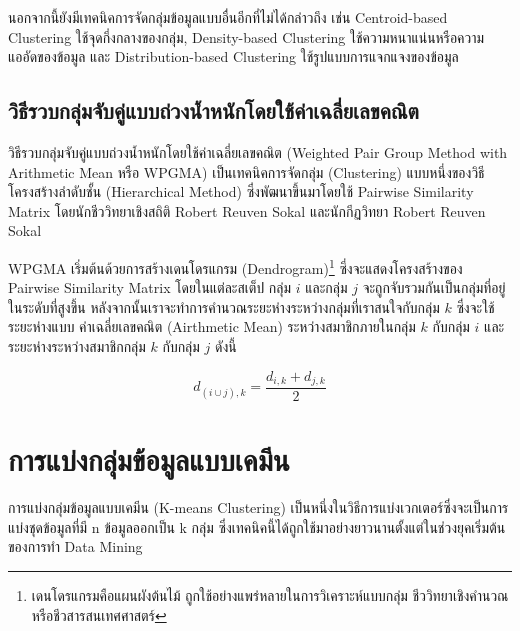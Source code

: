นอกจากนี้ยังมีเทคนิคการจัดกลุ่มข้อมูลแบบอื่นอีกที่ไม่ได้กล่าวถึง เช่น Centroid-based Clustering ใช้จุดกึ่งกลางของกลุ่ม, Density-based 
Clustering ใช้ความหนาแน่นหรือความแออัดของข้อมูล และ Distribution-based Clustering ใช้รูปแบบการแจกแจงของข้อมูล

\subsection{วิธีรวบกลุ่มจับคู่แบบถ่วงน้ำหนักโดยใช้ค่าเฉลี่ยเลขคณิต}
\label{ssec:wpgma}

วิธีรวบกลุ่มจับคู่แบบถ่วงน้ำหนักโดยใช้ค่าเฉลี่ยเลขคณิต (Weighted Pair Group Method with Arithmetic Mean หรือ WPGMA) 
เป็นเทคนิคการจัดกลุ่ม (Clustering) แบบหนึ่งของวิธีโครงสร้างลำดับชั้น (Hierarchical Method) ซึ่งพัฒนาขึ้นมาโดยใช้ Pairwise 
Similarity Matrix\autocite{sokal1958} โดยนักชีววิทยาเชิงสถิติ Robert Reuven Sokal และนักกีฏวิทยา Robert Reuven Sokal

WPGMA เริ่มต้นด้วยการสร้างเดนโดรแกรม (Dendrogram)\footnote{เดนโดรแกรมคือแผนผังต้นไม้ ถูกใช้อย่างแพร่หลายในการวิเคราะห์แบบกลุ่ม
ชีววิทยาเชิงคำนวณหรือชีวสารสนเทศศาสตร์} ซึ่งจะแสดงโครงสร้างของ Pairwise Similarity Matrix โดยในแต่ละสเต็ป กลุ่ม $i$ และกลุ่ม 
$j$ จะถูกจับรวมกันเป็นกลุ่มที่อยู่ในระดับที่สูงขึ้น หลังจากนั้นเราจะทำการคำนวณระยะห่างระหว่างกลุ่มที่เราสนใจกับกลุ่ม $k$ ซึ่งจะใช้ระยะห่างแบบ%
ค่าเฉลี่ยเลขคณิต (Airthmetic Mean) ระหว่างสมาชิกภายในกลุ่ม $k$ กับกลุ่ม $i$ และระยะห่างระหว่างสมาชิกกลุ่ม $k$ กับกลุ่ม $j$ ดังนี้

\begin{equation}\label{eq:wpgma}
    d_{(i \cup j),k} = \frac{d_{i,k} + d_{j,k}}{2} 
\end{equation}

\section{การแบ่งกลุ่มข้อมูลแบบเคมีน}
\label{sec:k_means}

การแบ่งกลุ่มข้อมูลแบบเคมีน (K-means Clustering) เป็นหนึ่งในวิธีการแบ่งเวกเตอร์ซึ่งจะเป็นการแบ่งชุดข้อมูลที่มี n ข้อมูลออกเป็น k กลุ่ม
ซึ่งเทคนิคนี้ได้ถูกใช้มาอย่างยาวนานตั้งแต่ในช่วงยุคเริ่มต้นของการทำ Data Mining\autocite{macqueen1967}

